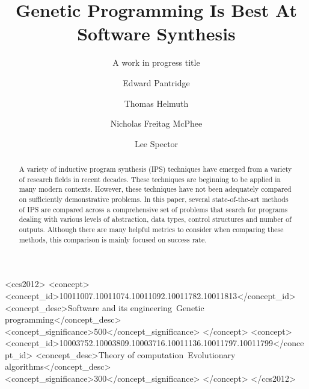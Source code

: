 \documentclass[sigconf]{acmart}
\begin{document}
\title{Genetic Programming Is Best At Software Synthesis}
\subtitle{A work in progress title}

\author{Edward Pantridge}

\author{Thomas Helmuth}

\author{Nicholas Freitag McPhee}

\author{Lee Spector}


\begin{abstract}
	A variety of inductive program synthesis (IPS) techniques have emerged from a variety of research fields in recent decades. These techniques are beginning to be applied in many modern contexts\cite{Gulwani2011}\cite{Katayama2013}. However, these techniques have not been adequately compared on sufficiently demonstrative problems. In this paper, several state-of-the-art methods of IPS are compared across a comprehensive set of problems that search for programs dealing with various levels of abstraction, data types, control structures and number of outputs. Although there are many helpful metrics to consider when comparing these methods, this comparison is mainly focused on success rate. 
\end{abstract}

%
%
\begin{CCSXML}
<ccs2012>
<concept>
<concept_id>10011007.10011074.10011092.10011782.10011813</concept_id>
<concept_desc>Software and its engineering~Genetic programming</concept_desc>
<concept_significance>500</concept_significance>
</concept>
<concept>
<concept_id>10003752.10003809.10003716.10011136.10011797.10011799</concept_id>
<concept_desc>Theory of computation~Evolutionary algorithms</concept_desc>
<concept_significance>300</concept_significance>
</concept>
</ccs2012>
\end{CCSXML}

\end{document}
